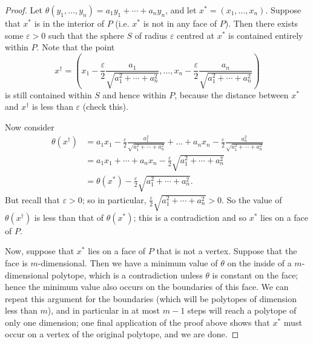 \documentclass[a4paper,leqno]{article}
\numberwithin{equation}{section}
\theoremstyle{definition}
\theoremstyle{remark}
\begin{document}
\begin{proof}
  Let $ \theta(y_1, \dots, y_n) = a_1 y_1 + \cdots + a_n y_n $, and let $ x^* = (x_1, \dots, x_n ) $. Suppose that $ x^* $ is in the interior
  of $ P $ (i.e. $ x^* $ is not in any face of $ P $). Then there exists some $ \varepsilon > 0 $ such that the sphere $ S $ of radius $ \varepsilon $ centred
  at $ x^* $ is contained entirely within $ P $. Note that the point
  \begin{displaymath}
    x^\dagger = (x_1 - \frac{\varepsilon}{2} \frac{a_1}{\sqrt{a_1^2 + \cdots + a_n^2}}, \dots, x_n - \frac{\varepsilon}{2} \frac{a_n}{\sqrt{a_1^2 + \cdots + a_n^2}})
  \end{displaymath}
  is still contained within $ S $ and hence within $ P $, because the distance between $ x^* $ and $ x^\dagger $ is less than $ \varepsilon $ (check this).

  Now consider
  \begin{align*}
    \theta(x^\dagger) &= a_1 x_1 - \frac{\varepsilon}{2} \frac{a_1^2}{\sqrt{a_1^2 + \cdots + a_n^2}} + \dots
                       + a_n x_n - \frac{\varepsilon}{2} \frac{a_n^2}{\sqrt{a_1^2 + \cdots + a_n^2}}\\
                      &= a_1 x_1 + \cdots + a_n x_n - \frac{\varepsilon}{2} \sqrt{a_1^2 + \cdots + a_n^2}\\
                      &= \theta(x^*) - \frac{\varepsilon}{2} \sqrt{a_1^2 + \cdots + a_n^2}.
  \end{align*}
  But recall that $ \varepsilon > 0 $; so in particular, $ \frac{\varepsilon}{2} \sqrt{a_1^2 + \cdots + a_n^2} > 0 $. So the value of $ \theta(x^\dagger) $ is
  less than that of $ \theta(x^*) $; this is a contradiction and so $ x^* $ lies on a face of $ P $.

  Now, suppose that $ x^* $ lies on a face of $ P $ that is not a vertex. Suppose that the face is $ m$-dimensional. Then we have a minimum value of $ \theta $ on
  the inside of a $ m$-dimensional polytope, which is a contradiction unless $ \theta $ is constant on the face; hence the minimum value also occurs on the boundaries
  of this face. We can repeat this argument for the boundaries (which will be polytopes of dimension less than $ m $), and in particular in at most $ m-1 $ steps
  will reach a polytope of only one dimension; one final application of the proof above shows that $ x^* $ must occur on a vertex of the original polytope, and we
  are done.
\end{proof}
\end{document}
